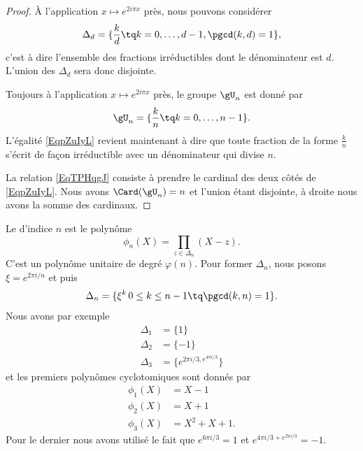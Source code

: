 \begin{proof}
    À l'application \( x\mapsto  e^{2i\pi x}\) près, nous pouvons considérer
    \begin{equation}
        \Delta_d=\{ \frac{ k }{ d }\tq k=0,\ldots, d-1, \pgcd(k,d)=1 \},
    \end{equation}
    c'est à dire l'ensemble des fractions irréductibles dont le dénominateur est \( d\). L'union des \( \Delta_d\) sera donc disjointe.
    
    Toujours à l'application \( x\mapsto  e^{2i\pi x}\) près, le groupe \( \gU_n\) est donné par
    \begin{equation}
        \gU_n=\{ \frac{ k }{ n }\tq k=0,\ldots, n-1 \}.
    \end{equation}
    L'égalité \eqref{EqpZuIyL} revient maintenant à dire que toute fraction de la forme \( \frac{ k }{ n }\) s'écrit de façon irréductible avec un dénominateur qui divise \( n\).

    La relation \eqref{EqTPHqgJ} consiste à prendre le cardinal des deux côtés de \eqref{EqpZuIyL}. Nous avons \( \Card(\gU_n)=n\) et l'union étant disjointe, à droite nous avons la somme des cardinaux.
\end{proof}

Le  d'indice \( n\) est le polynôme
\begin{equation}
    \phi_n(X)=\prod_{z\in\Delta_n}(X-z).
\end{equation}
C'est un polynôme unitaire de degré \( \varphi(n)\). Pour former \( \Delta_n\), nous posons \( \xi= e^{2\pi i/n}\) et puis
\begin{equation}
    \Delta_n=\{ \xi^k\, 0\leq k\leq n-1\tq \pgcd(k,n)=1 \}.
\end{equation}
Nous avons par exemple
\begin{subequations}
    \begin{align}
        \Delta_1&=\{ 1 \}\\
        \Delta_2&=\{ -1 \}\\
        \Delta_3&=\{  e^{2\pi i/3, e^{4\pi i/3}} \}
    \end{align}
\end{subequations}
et les premiers polynômes cyclotomiques sont donnés par
\begin{subequations}
    \begin{align}
        \phi_1(X)&=X-1\\
        \phi_2(X)&=X+1\\
        \phi_3(X)&=X^2+X+1.
    \end{align}
\end{subequations}
Pour le dernier nous avons utilisé le fait que \(  e^{6\pi i/3}=1\) et \(  e^{4\pi i/3+ e^{2\pi i/3}}=-1\).

